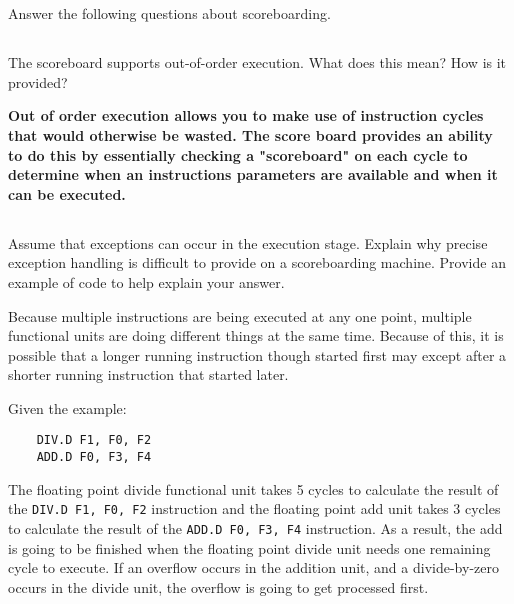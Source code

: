 \documentclass{article}
\begin{document}
\section{}
Answer the following questions about scoreboarding.
\begin{adjustwidth}{2.5em}{0pt}
\subsection{}
The scoreboard supports out-of-order execution. What does this mean? How is it provided?

\vspace{5mm}
\textbf{Out of order execution allows you to make use of instruction cycles that would otherwise be wasted. The score board provides an ability to do this by essentially checking a "scoreboard" on each cycle to determine when an instructions parameters are available and when it can be executed.}

\subsection{} 
Assume that exceptions can occur in the execution stage.  Explain why precise exception handling is difficult to provide on a scoreboarding machine. Provide an example of code to help explain your answer.

\vspace{5mm}
Because multiple instructions are being executed at any one point, multiple functional units are doing different things at the same time. Because of this, it is possible that a longer running instruction though started first may except after a shorter running instruction that started later. 

Given the example:

\vspace{3mm} 
\begin{lstlisting}
	DIV.D F1, F0, F2
	ADD.D F0, F3, F4	
\end{lstlisting}

\vspace{3mm}
The floating point divide functional unit takes 5 cycles to calculate the result of the \texttt{DIV.D F1, F0, F2} instruction and the floating point add unit takes 3 cycles to calculate the result of the \texttt{ADD.D F0, F3, F4} instruction. As a result, the add is going to be finished when the floating point divide unit needs one remaining cycle to execute. If an overflow occurs in the addition unit, and a divide-by-zero occurs in the divide unit, the overflow is going to get processed first. 


\end{adjustwidth}
\end{document}
